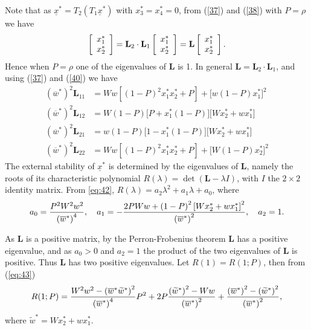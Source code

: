 \documentclass[9pt, a4paper]{extarticle}
\newcommand{\cl}{\mathbf{L}}
\newcommand{\ci}{I}
\begin{document}
 Note that as $\underline x^* =T_2(T_1\underline x^*)$ with $x_3^*=x_4^*=0$, from (\ref{37}) and (\ref{38}) with $P=\rho$ we have
 \begin{equation}\left[\begin{array}{c}x_1^*\\ x_2^*\end{array}\right]= \cl_2\cdot\cl_1\left[\begin{array}{c}x_1^*\cr x_2^*\end{array}\right] =\cl\left[\begin{array}{c}x_1^*\\ x_2^*\end{array}\right].
 \label{41}\end{equation}
 Hence when $P=\rho$ one of the eigenvalues of $\cl$ is 1.
 In general $\cl=\cl_2\cdot\cl_1$, and using (\ref{37}) and (\ref{40}) we have
  \begin{equation}
  \begin{aligned}
 \left(\overline w^*\right)^2\cl_{11} &=Ww\left[(1-P)^2x_1^*x_2^* +P\right] +\bigl[w(1-P)x_1^*\bigr]^2 \\
 \left(\overline w^*\right)^2\cl_{12} &=W(1-P)\bigl[P+x_1^*(1-P)\bigr]\bigl[Wx_2^* +wx_1^*\bigr]\\
 \left(\overline w^*\right)^2\cl_{21} &=w(1-P)\bigl[1-x_1^*(1-P)\bigr]\bigl[Wx_2^* +wx_1^*\bigr]\\
 \left(\overline w^*\right)^2\cl_{22} &= Ww\left[(1-P)^2x_1^*x_2^* +P\right] +\bigl[W(1-P)x_2^*\bigr]^2
 \end{aligned}
 \label{eq:42}\end{equation}
 The external stability of $\underline x^*$ is determined by the eigenvalues of $\cl$, namely the roots of its characteristic polynomial $R(\lambda) =\det(\cl-\lambda\ci)$, with $\ci$ the $2\times 2$ identity matrix. From \eqref{eq:42}, $R(\lambda)=a_2\lambda^2 +a_1\lambda +a_0$, where
 \begin{equation}
 a_0={P^2W^2w^2\over\left(\overline w^*\right)^4}, \quad
 a_1=-{2PWw +\left(1-P\right)^2\left[Wx_2^* +wx_1^*\right]^2\over \left(\overline w^*\right)^2},\quad
 a_2=1.
 \label{eq:43}\end{equation}

As $\cl$ is a positive matrix, by the Perron-Frobenius theorem $\cl$ has a positive eigenvalue, and as $a_0>0$ and $a_2=1$ the product of the two eigenvalues of $\cl$ is positive. Thus $\cl$ has two positive eigenvalues. Let $R(1)=R(1;P)$, then from (\ref{eq:43})
  \begin{equation}
  R(1;P) = {W^2w^2-\left(\overline w^*\widetilde w^*\right)^2\over\left(\overline w^*\right)^4}P^2 +2P{\left(\widetilde w^*\right)^2 -Ww\over \left(\overline w^*\right)^2} +{\left(\overline w^*\right)^2-\left(\widetilde w^*\right)^2\over\left(\overline w^*\right)^2},
  \end{equation}
where $\widetilde w^* =Wx_2^* +wx_1^*$.  
\end{document}
